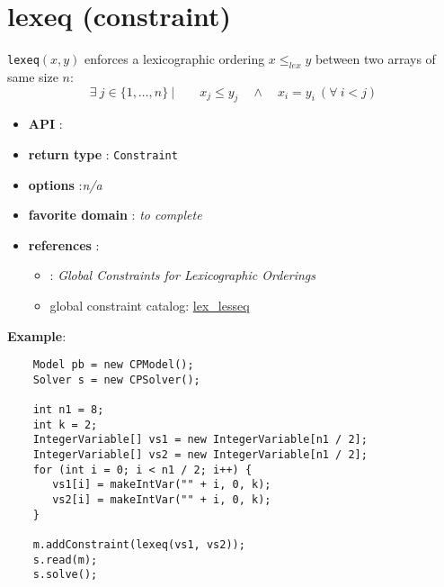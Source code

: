 \label{lexeq}
\hypertarget{lexeq}{}

\section{lexeq (constraint)}\label{lexeq:lexeqconstraint}\hypertarget{lexeq:lexeqconstraint}{}
\begin{notedef}
  \texttt{lexeq}$(x,y)$ enforces a lexicographic ordering  $x \le_{lex} y$ between two arrays of same size $n$:
$$\exists\ j\in\{1,\ldots,n\}\ |\qquad x_j\le y_j\quad \land\quad x_i=y_i\ (\forall\  i<j)$$
\end{notedef}

\begin{itemize}
	\item \textbf{API} : 
	\item \textbf{return type} : \texttt{Constraint}
	\item \textbf{options} :\emph{n/a}
	\item \textbf{favorite domain} : \emph{to complete}
	\item \textbf{references} :
      \begin{itemize}
      \item \cite{FrischCP02}: \emph{Global Constraints for Lexicographic Orderings}
      \item global constraint catalog: \href{http://www.emn.fr/x-info/sdemasse/gccat/Clex_lesseq.html}{lex\_lesseq}
      \end{itemize}
\end{itemize}

\textbf{Example}:
\begin{lstlisting}
	Model pb = new CPModel();
	Solver s = new CPSolver();
	
	int n1 = 8;
	int k = 2;
	IntegerVariable[] vs1 = new IntegerVariable[n1 / 2];
	IntegerVariable[] vs2 = new IntegerVariable[n1 / 2];
	for (int i = 0; i < n1 / 2; i++) {
	   vs1[i] = makeIntVar("" + i, 0, k);
	   vs2[i] = makeIntVar("" + i, 0, k);
	}
	
	m.addConstraint(lexeq(vs1, vs2));
	s.read(m);
	s.solve();
\end{lstlisting} 
